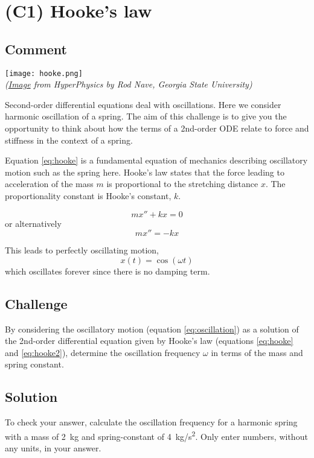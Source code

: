 \section{(C1) Hooke's law}
\label{sec:hooke}

\subsection*{Comment}

\texttt{[image: hooke.png]}\\
\emph{(\href{http://hyperphysics.phy-astr.gsu.edu/hbase/imgmec/hook.gif}{Image} from HyperPhysics by Rod Nave, Georgia State University)}

Second-order differential equations deal with oscillations. Here we consider harmonic oscillation of a spring. The aim of this challenge is to give you the opportunity to think about how the terms of a 2nd-order ODE relate to force and stiffness in the context of a spring.

Equation \ref{eq:hooke} is a fundamental equation of mechanics describing oscillatory motion such as the spring here. Hooke's law states that the force leading to acceleration of the mass $m$ is proportional to the stretching distance $x$. The proportionality constant is Hooke's constant, $k$.

\begin{equation}
    \label{eq:hooke}
    m x'' + k x = 0
\end{equation}
or alternatively
\begin{equation}
    \label{eq:hooke2}
    m x'' = -k x
\end{equation}

This leads to perfectly oscillating motion,
\begin{equation}
    \label{eq:oscillation}
     x(t)=\cos(\omega t)
\end{equation}
which oscillates forever since there is no damping term.

\subsection*{Challenge}
By considering the oscillatory motion (equation \ref{eq:oscillation}) as a solution of the 2nd-order differential equation given by Hooke's law (equations \ref{eq:hooke} and \ref{eq:hooke2}), determine the oscillation frequency $\omega$ in terms of the mass and spring constant.

\subsection*{Solution}
To check your answer, calculate the oscillation frequency for a harmonic spring with a mass of \SI{2}{kg} and spring-constant of \SI{4}{kg/s^2}. Only enter numbers, without any units, in your answer.

